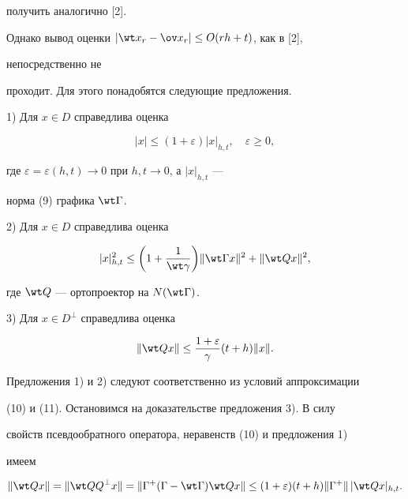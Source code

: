 получить аналогично [2]. 


Однако вывод оценки $|\wt x_r-\ov x_r|\le O(r h+t)$, как в [2], 


непосредственно не 


проходит. Для этого понадобятся следующие предложения. 


 


1) Для $x\in D$ справедлива оценка 


\begin{equation} 


|x|\le(1+\varepsilon)|x|_{h,t},\quad \varepsilon\ge0, 


\end{equation} 


где $\varepsilon=\varepsilon(h,t)\to0$ при $h,t\to0$, а $|x|_{h,t}$ --- 


норма (9) графика $\wt\Gamma$.  


 


2) Для $x\in D$ справедлива оценка 


$$ 


|x|^2_{h,t}\le\bigg(1+\frac{1}{\wt\gamma} \bigg) 


\|\wt\Gamma x\|^2+\|\wt Q x\|^2, 


$$ 


где $\wt Q$ --- ортопроектор на $N(\wt\Gamma)$.  


 


3) Для $x\in D^\bot$ справедлива оценка 


\begin{equation} 


\|\wt Q x\|\le\frac{1+\varepsilon}{\gamma}(t+h)\|x\|. 


\end{equation} 


Предложения 1) и 2) следуют соответственно из условий аппроксимации  


(10) и (11). Остановимся на доказательстве предложения 3). В силу 


свойств псевдообратного оператора, неравенств (10) и предложения 1)  


имеем 


$$ 


\|\wt Q x\|=\|\wt Q Q^\bot x\|=\|\Gamma^+(\Gamma-\wt\Gamma) 


\wt Q x\|\le(1+\varepsilon)(t+h)\|\Gamma^+\|\,|\wt Q x|_{h,t}. 


$$ 


